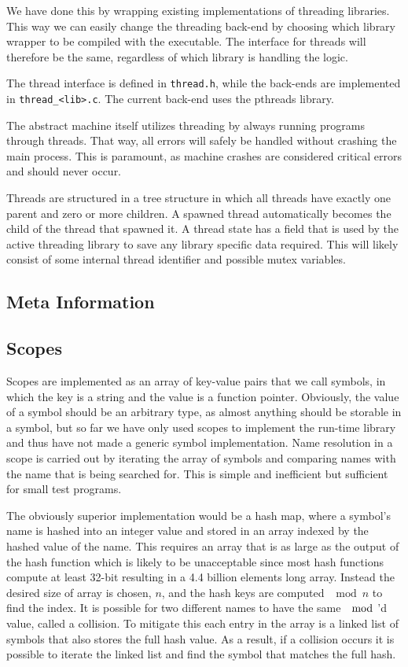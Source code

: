 We have done this by wrapping existing implementations of threading
libraries. This way we can easily change the threading back-end by choosing
which library wrapper to be compiled with the executable. The interface for
threads will therefore be the same, regardless of which library is handling the
logic.

The thread interface is defined in {\tt thread.h}, while the back-ends are
implemented in {\tt thread\_<lib>.c}. The current back-end uses the pthreads
library.

The abstract machine itself utilizes threading by always running programs
through threads. That way, all errors will safely be handled without crashing
the main process. This is paramount, as machine crashes are considered critical
errors and should never occur.

Threads are structured in a tree structure in which all threads have exactly one
parent and zero or more children. A spawned thread automatically becomes the
child of the thread that spawned it. A thread state has a  field
that is used by the active threading library to save any library specific data
required. This will likely consist of some internal thread identifier and
possible mutex variables.

\subsection{Meta Information}
\label{sec:implementation:meta}


\subsection{Scopes}

Scopes are implemented as an array of key-value pairs that we call symbols, in
which the key is a string and the value is a function pointer. Obviously, the
value of a symbol should be an arbitrary type, as almost anything should be
storable in a symbol, but so far we have only used scopes to implement the
run-time library and thus have not made a generic symbol implementation. Name
resolution in a scope is carried out by iterating the array of symbols and
comparing names with the name that is being searched for. This is simple and
inefficient but sufficient for small test programs.

The obviously superior implementation would be a hash map, where a symbol's name
is hashed into an integer value and stored in an array indexed by the hashed
value of the name. This requires an array that is as large as the output of the
hash function which is likely to be unacceptable since most hash functions
compute at least 32-bit resulting in a 4.4 billion elements long array. Instead
the desired size of array is chosen, $n$, and the hash keys are computed
$\mod n$ to find the index. It is possible for two different names to have the
same $\mod$'d value, called a collision. To mitigate this each entry in the
array is a linked list of symbols that also stores the full hash value. As a
result, if a collision occurs it is possible to iterate the linked list and find
the symbol that matches the full hash.

